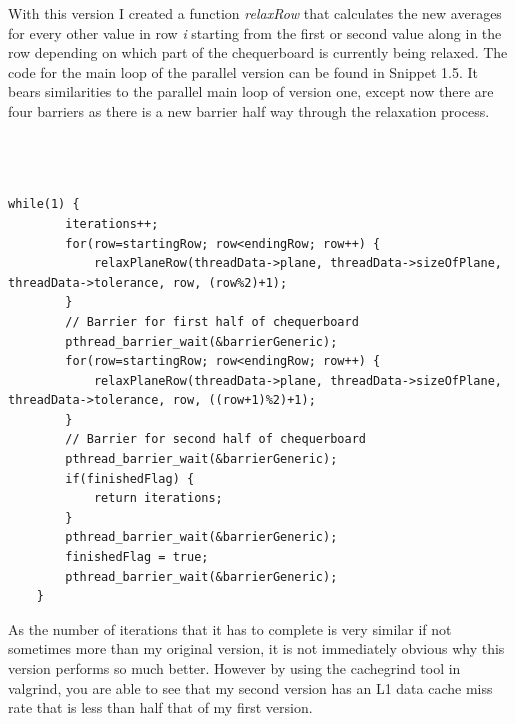 \documentclass{report}
\begin{document}
With this version I created a function \textit{relaxRow} that calculates the new averages for every other value in row \textit{i} starting from the first or second value along in the row depending on which part of the chequerboard is currently being relaxed. The code for the main loop of the parallel version can be found in Snippet 1.5. It bears similarities to the parallel main loop of version one, except now there are four barriers as there is a new barrier half way through the relaxation process.
\\\\\\\\
\begin{lstlisting}[style=customc,caption=Version 2 Parallel Main Loop]
    while(1) {
        iterations++;
        for(row=startingRow; row<endingRow; row++) {
            relaxPlaneRow(threadData->plane, threadData->sizeOfPlane, threadData->tolerance, row, (row%2)+1);
        }
        // Barrier for first half of chequerboard
        pthread_barrier_wait(&barrierGeneric);        
        for(row=startingRow; row<endingRow; row++) {
            relaxPlaneRow(threadData->plane, threadData->sizeOfPlane, threadData->tolerance, row, ((row+1)%2)+1);
        }
        // Barrier for second half of chequerboard
        pthread_barrier_wait(&barrierGeneric);
        if(finishedFlag) {
            return iterations;
        }
        pthread_barrier_wait(&barrierGeneric);
        finishedFlag = true;
        pthread_barrier_wait(&barrierGeneric);
    }
\end{lstlisting}

As the number of iterations that it has to complete is very similar if not sometimes more than my original version, it is not immediately obvious why this version performs so much better. However by using the cachegrind tool in valgrind, you are able to see that my second version has an L1 data cache miss rate that is less than half that of my first version.
\end{document}
